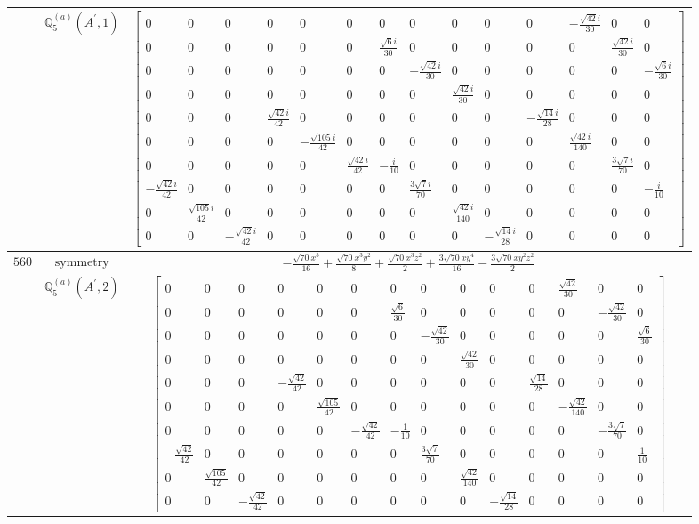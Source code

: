 \documentclass[fleqn,8pt,landscape]{jsarticle}
\begin{document}
\begin{longtable}{ccc}
$  $ & $ \mathbb{Q}_{5}^{(a)}(A^{\prime},1) $ & $ \begin{bmatrix} 0 & 0 & 0 & 0 & 0 & 0 & 0 & 0 & 0 & 0 & 0 & - \frac{\sqrt{42} i}{30} & 0 & 0 \\ 0 & 0 & 0 & 0 & 0 & 0 & \frac{\sqrt{6} i}{30} & 0 & 0 & 0 & 0 & 0 & \frac{\sqrt{42} i}{30} & 0 \\ 0 & 0 & 0 & 0 & 0 & 0 & 0 & - \frac{\sqrt{42} i}{30} & 0 & 0 & 0 & 0 & 0 & - \frac{\sqrt{6} i}{30} \\ 0 & 0 & 0 & 0 & 0 & 0 & 0 & 0 & \frac{\sqrt{42} i}{30} & 0 & 0 & 0 & 0 & 0 \\ 0 & 0 & 0 & \frac{\sqrt{42} i}{42} & 0 & 0 & 0 & 0 & 0 & 0 & - \frac{\sqrt{14} i}{28} & 0 & 0 & 0 \\ 0 & 0 & 0 & 0 & - \frac{\sqrt{105} i}{42} & 0 & 0 & 0 & 0 & 0 & 0 & \frac{\sqrt{42} i}{140} & 0 & 0 \\ 0 & 0 & 0 & 0 & 0 & \frac{\sqrt{42} i}{42} & - \frac{i}{10} & 0 & 0 & 0 & 0 & 0 & \frac{3 \sqrt{7} i}{70} & 0 \\ - \frac{\sqrt{42} i}{42} & 0 & 0 & 0 & 0 & 0 & 0 & \frac{3 \sqrt{7} i}{70} & 0 & 0 & 0 & 0 & 0 & - \frac{i}{10} \\ 0 & \frac{\sqrt{105} i}{42} & 0 & 0 & 0 & 0 & 0 & 0 & \frac{\sqrt{42} i}{140} & 0 & 0 & 0 & 0 & 0 \\ 0 & 0 & - \frac{\sqrt{42} i}{42} & 0 & 0 & 0 & 0 & 0 & 0 & - \frac{\sqrt{14} i}{28} & 0 & 0 & 0 & 0 \end{bmatrix} $ \\ \hline
$ 560 $ & $ \text{symmetry} $ & $ - \frac{\sqrt{70} x^{5}}{16} + \frac{\sqrt{70} x^{3} y^{2}}{8} + \frac{\sqrt{70} x^{3} z^{2}}{2} + \frac{3 \sqrt{70} x y^{4}}{16} - \frac{3 \sqrt{70} x y^{2} z^{2}}{2} $ \\
$  $ & $ \mathbb{Q}_{5}^{(a)}(A^{\prime},2) $ & $ \begin{bmatrix} 0 & 0 & 0 & 0 & 0 & 0 & 0 & 0 & 0 & 0 & 0 & \frac{\sqrt{42}}{30} & 0 & 0 \\ 0 & 0 & 0 & 0 & 0 & 0 & \frac{\sqrt{6}}{30} & 0 & 0 & 0 & 0 & 0 & - \frac{\sqrt{42}}{30} & 0 \\ 0 & 0 & 0 & 0 & 0 & 0 & 0 & - \frac{\sqrt{42}}{30} & 0 & 0 & 0 & 0 & 0 & \frac{\sqrt{6}}{30} \\ 0 & 0 & 0 & 0 & 0 & 0 & 0 & 0 & \frac{\sqrt{42}}{30} & 0 & 0 & 0 & 0 & 0 \\ 0 & 0 & 0 & - \frac{\sqrt{42}}{42} & 0 & 0 & 0 & 0 & 0 & 0 & \frac{\sqrt{14}}{28} & 0 & 0 & 0 \\ 0 & 0 & 0 & 0 & \frac{\sqrt{105}}{42} & 0 & 0 & 0 & 0 & 0 & 0 & - \frac{\sqrt{42}}{140} & 0 & 0 \\ 0 & 0 & 0 & 0 & 0 & - \frac{\sqrt{42}}{42} & - \frac{1}{10} & 0 & 0 & 0 & 0 & 0 & - \frac{3 \sqrt{7}}{70} & 0 \\ - \frac{\sqrt{42}}{42} & 0 & 0 & 0 & 0 & 0 & 0 & \frac{3 \sqrt{7}}{70} & 0 & 0 & 0 & 0 & 0 & \frac{1}{10} \\ 0 & \frac{\sqrt{105}}{42} & 0 & 0 & 0 & 0 & 0 & 0 & \frac{\sqrt{42}}{140} & 0 & 0 & 0 & 0 & 0 \\ 0 & 0 & - \frac{\sqrt{42}}{42} & 0 & 0 & 0 & 0 & 0 & 0 & - \frac{\sqrt{14}}{28} & 0 & 0 & 0 & 0 \end{bmatrix} $ \\ \hline

\end{longtable}
\end{document}
